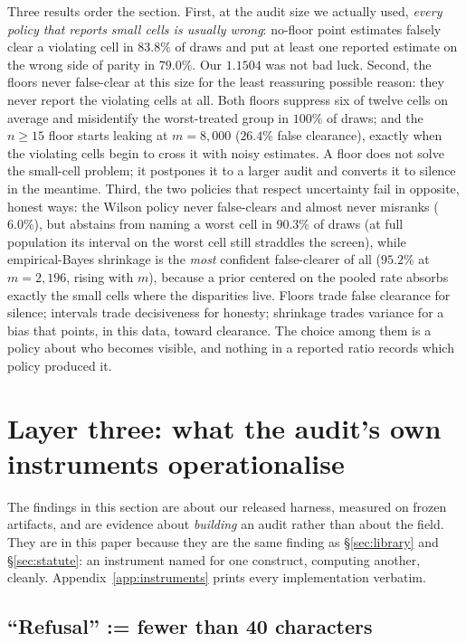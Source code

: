 \documentclass[sigconf,nonacm]{acmart}
\begin{document}
Three results order the section. First, at the audit size we actually used,
\emph{every policy that reports small cells is usually wrong}: no-floor point
estimates falsely clear a violating cell in $83.8\%$ of draws and put at least
one reported estimate on the wrong side of parity in $79.0\%$. Our
$1.1504$ was not bad luck. Second, the floors never false-clear at this size
for the least reassuring possible reason: they never report the violating
cells at all. Both floors suppress six of twelve cells on average and
misidentify the worst-treated group in $100\%$ of draws; and the $n \geq 15$
floor starts leaking at $m{=}8{,}000$ ($26.4\%$ false clearance), exactly when
the violating cells begin to cross it with noisy estimates. A floor does not
solve the small-cell problem; it postpones it to a larger audit and converts
it to silence in the meantime. Third, the two policies that respect
uncertainty fail in opposite, honest ways: the Wilson policy never
false-clears and almost never misranks ($6.0\%$), but abstains from naming a
worst cell in $90.3\%$ of draws (at full population its interval on the
worst cell still straddles the screen), while empirical-Bayes shrinkage is
the \emph{most} confident false-clearer of all ($95.2\%$ at $m{=}2{,}196$,
rising with $m$), because a prior centered on the pooled rate absorbs exactly
the small cells where the disparities live. Floors trade false clearance for
silence; intervals trade decisiveness for honesty; shrinkage trades variance
for a bias that points, in this data, toward clearance. The choice among them
is a policy about who becomes visible, and nothing in a reported ratio records
which policy produced it.

\section{Layer three: what the audit's own instruments operationalise}
\label{sec:instruments}

The findings in this section are about our released harness, measured on
frozen artifacts, and are evidence about \emph{building} an audit rather than
about the field. They are in this paper because they are the same finding as
\S\ref{sec:library} and \S\ref{sec:statute}: an instrument named for one
construct, computing another, cleanly. Appendix~\ref{app:instruments} prints
every implementation verbatim.

\subsection{``Refusal'' := fewer than 40 characters}
\label{sec:refusal}
\end{document}

